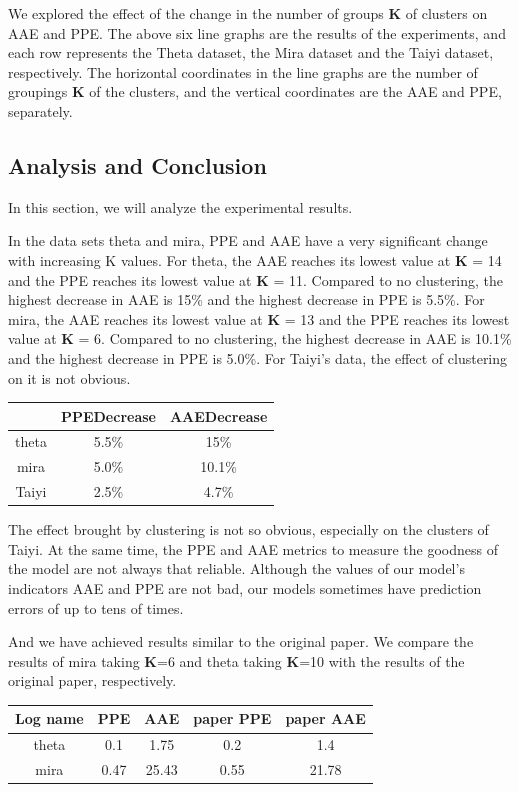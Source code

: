 \documentclass[conference,compsoc]{IEEEtran}
\begin{document}
We explored the effect of the change in the number of groups \textbf{K} of clusters on AAE and PPE. The above six line graphs are the results of the experiments, and each row represents the Theta dataset, the Mira dataset and the Taiyi dataset, respectively. The horizontal coordinates in the line graphs are the number of groupings \textbf{K} of the clusters, and the vertical coordinates are the AAE and PPE, separately.


\subsection{Analysis and Conclusion}
In this section, we will analyze the experimental results.

In the data sets theta and mira, PPE and AAE have a very significant change with increasing K values. For theta, the AAE reaches its lowest value at \textbf{K} = 14 and the PPE reaches its lowest value at \textbf{K} = 11. Compared to no clustering, the highest decrease in AAE is 15\% and the highest decrease in PPE is 5.5\%. For mira, the AAE reaches its lowest value at \textbf{K} = 13 and the PPE reaches its lowest value at \textbf{K} = 6. Compared to no clustering, the highest decrease in AAE is 10.1\% and the highest decrease in PPE is 5.0\%. For Taiyi's data, the effect of clustering on it is not obvious. 


\begin{center}
	\begin{tabular}{|c|c|c|} 
		\hline
		&  PPEDecrease & AAEDecrease\\ [0.5ex] 
		\hline\hline
		theta&5.5\% &15\%\\
		\hline
		mira& 5.0\%&10.1\%\\
		\hline
		Taiyi&2.5\%&4.7\%\\
		\hline
	\end{tabular}
	\label{table:improve}
\end{center}


The effect brought by clustering is not so obvious, especially on the clusters of Taiyi. At the same time, the PPE and AAE metrics to measure the goodness of the model are not always that reliable. Although the values of our model's indicators AAE and PPE are not bad, our models sometimes have prediction errors of up to tens of times. 

And we have achieved results similar to the original paper. We compare the results of mira taking \textbf{K}=6 and theta taking \textbf{K}=10 with the results of the original paper, respectively.  
\begin{center}
	\begin{tabular}{|c|c|c|c|c|} 
		\hline
		Log name &  PPE & AAE & paper PPE & paper AAE \\[0.5ex] 
		\hline\hline
		theta& 0.1&1.75&0.2&1.4\\
		\hline
		mira &0.47 &25.43&0.55& 21.78\\
		\hline
	\end{tabular}
	\label{table:compare}
\end{center}
\end{document}
